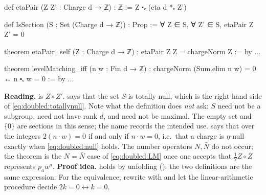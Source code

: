 \begin{leanbox}
\begin{leancode}
def etaPair (Z Z' : Charge d → ℤ) : ℤ := Z ⬝ᵥ (eta d *ᵥ Z')

def IsSection (S : Set (Charge d → ℤ)) : Prop :=
  ∀ Z ∈ S, ∀ Z' ∈ S, etaPair Z Z' = 0

theorem etaPair_self (Z : Charge d → ℤ) : etaPair Z Z = chargeNorm Z := by ...

theorem levelMatching_iff (n w : Fin d → ℤ) :
    chargeNorm (Sum.elim n w) = 0 ↔ n ⬝ᵥ w = 0 := by ...
\end{leancode}
\textbf{Reading.}  is $Z\circ Z'$.  says that the set $S$ is
totally null, which is the right-hand side of \eqref{eq:doubled:totallynull}. Note what the
definition does \emph{not} ask: $S$ need not be a subgroup, need not have rank $d$, and need not
be maximal. The empty set and $\{0\}$ are sections in this sense; the name records the intended
use.  says that over the integers $2(n\cdot w)=0$ if and only if
$n\cdot w=0$, i.e.\ that a charge is $\eta$-null exactly when \eqref{eq:doubled:null} holds. The
number operators $N,\bar N$ do not occur; the theorem is the $N=\bar N$ case of
\eqref{eq:doubled:LM} once one accepts that $\frac12Z\circ Z$ represents $p_aw^a$.
\textbf{Proof idea.}  holds by unfolding (): the two definitions are
the same expression. For the equivalence, rewrite with  and let the
linear-arithmetic procedure  decide $2k=0\leftrightarrow k=0$.
\end{leanbox}

